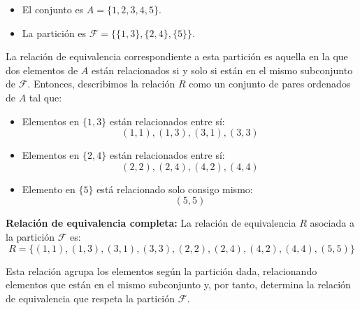 \begin{solution}
\begin{itemize}
    \item El conjunto es \( A = \{1, 2, 3, 4, 5\} \).
    \item La partición es \( \mathscr{F} = \{\{1, 3\}, \{2, 4\}, \{5\}\} \).
\end{itemize}    
    
    La relación de equivalencia correspondiente a esta partición es aquella en la que dos elementos de \( A \) están relacionados si y solo si están en el mismo subconjunto de \( \mathscr{F} \). Entonces, describimos la relación \( R \) como un conjunto de pares ordenados de \( A \) tal que:
    
    \begin{itemize}
        \item Elementos en \( \{1, 3\} \) están relacionados entre sí:
       \[
       (1, 1), (1, 3), (3, 1), (3, 3)
       \]
    
        \item Elementos en \( \{2, 4\} \) están relacionados entre sí:
       \[
       (2, 2), (2, 4), (4, 2), (4, 4)
       \]
    
        \item Elemento en \( \{5\} \) está relacionado solo consigo mismo:
       \[
       (5, 5)
       \]
    
    \end{itemize}
    
    \textbf{Relación de equivalencia completa:}
    La relación de equivalencia \( R \) asociada a la partición \( \mathscr{F} \) es:
    \[
    R = \{(1, 1), (1, 3), (3, 1), (3, 3), (2, 2), (2, 4), (4, 2), (4, 4), (5, 5)\}
    \]
    
    Esta relación agrupa los elementos según la partición dada, relacionando elementos que están en el mismo subconjunto y, por tanto, determina la relación de equivalencia que respeta la partición \( \mathscr{F} \).
\end{solution}